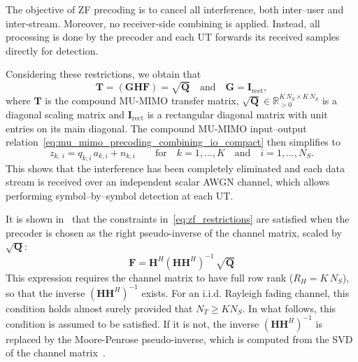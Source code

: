 The objective of \acf{ZF} precoding is to cancel all interference, both inter--user and inter-stream.
Moreover, no receiver-side combining is applied. Instead, all processing is done by the precoder and each \ac{UT} forwards its received samples directly for detection.

Considering these restrictions, we obtain that
\begin{equation}
\label{eq:zf_restrictions}
    \mathbf{T} = (\mathbf{G}\mathbf{H}\mathbf{F}) = \sqrt{\mathbf{Q}} \quad \text{and} \quad \mathbf{G} = \mathbf{I}_{\mathrm{rect}},
\end{equation}
where $\mathbf{T}$ is the compound \ac{MU}-\ac{MIMO} transfer matrix, $\sqrt{\mathbf{Q}} \in \mathbb{R}_{>0}^{K\,N_S \times K\,N_S}$ is a diagonal scaling matrix and $\mathbf{I}_{\mathrm{rect}}$ is a rectangular diagonal matrix with unit entries on its main diagonal.
The compound \ac{MU}-\ac{MIMO} input--output relation~\eqref{eq:mu_mimo_precoding_combining_io_compact} then simplifies to
\begin{equation}
\label{eq:zf_io}
    z_{k,\,i} = q_{k, i} \, a_{k, i} + n_{k, i} \qquad \text{for} \quad k = 1, \dots, K \quad \text{and} \quad i = 1, \dots, N_S.
\end{equation}
This shows that the interference has been completely eliminated and each data stream is received over an independent scalar \ac{AWGN} channel, which allows performing symbol--by--symbol detection at each \ac{UT}.

It is shown in~\cite{mu_mimo_ZF_precoding} that the constraints in~\eqref{eq:zf_restrictions} are satisfied when the precoder is chosen as the right pseudo-inverse of the channel matrix, scaled by $\sqrt{\mathbf{Q}}$:
\begin{equation}
\label{eq:zf_precoder}
    \mathbf{F} = \mathbf{H}^H (\mathbf{H} \mathbf{H}^H)^{-1} \, \sqrt{\mathbf{Q}}
\end{equation}
This expression requires the channel matrix to have full row rank ($R_H = K\,N_S$), so that the inverse $(\mathbf{H}\mathbf{H}^H)^{-1}$ exists.
For an \ac{i.i.d.} Rayleigh fading channel, this condition holds almost surely provided that $N_T \geq K N_S$.
In what follows, this condition is assumed to be satisfied.
If it is not, the inverse $(\mathbf{H}\mathbf{H}^H)^{-1}$ is replaced by the Moore-Penrose pseudo-inverse, which is computed from the \ac{SVD} of the channel matrix~\cite{moore_penrose_pseudoinverse}.

